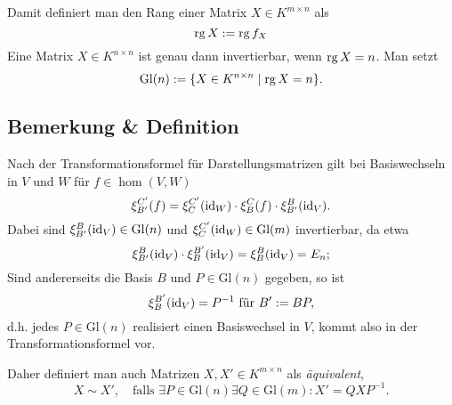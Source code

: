	\begin{Definition}
		Damit definiert man den Rang einer Matrix $ X\in K^{m\times n} $ als
		\[
			\operatorname{rg} X:=\operatorname{rg} f_X
		\]
		Eine Matrix $ X\in K^{n\times n} $ ist genau dann invertierbar, wenn $ \operatorname{rg} X = n $. Man setzt
		\[
			\mathrm{Gl}(n):= \{X\in K^{n\times n}\mid \operatorname{rg} X =n\}.
		\]
	\end{Definition}
\subsection{Bemerkung \& Definition}
	Nach der Transformationsformel für Darstellungsmatrizen gilt bei Basiswechseln in $ V $ und $ W $ für $ f\in \hom(V,W) $
	\[
		\xi_{B'}^{C'}(f) = \xi_C^{C'}(\operatorname{id}_W)\cdot \xi_B^C(f)\cdot \xi_{B'}^B(\operatorname{id}_V).
	\]
	Dabei sind $ \xi_{B'}^B(\operatorname{id}_V)\in \mathrm{Gl}(n) $ und $ \xi_C^{C'}(\operatorname{id}_W)\in \mathrm{Gl}(m) $ invertierbar, da etwa
	\[
		\xi^B_{B'}(\operatorname{id}_V)\cdot\xi_B^{B'}(\operatorname{id}_V) = \xi_B^B(\operatorname{id}_V)=E_n;
	\]
	Sind andererseits die Basis $ B $ und $ P\in \mathrm{Gl}(n) $ gegeben, so ist
	\[
		\xi_B^{B'}(\operatorname{id}_V)=P^{-1} \text{ für } B':= BP,
	\]
	d.h. jedes $ P\in \mathrm{Gl}(n) $ realisiert einen Basiswechsel in $ V $, kommt also in der Transformationsformel vor.

	\begin{Definition}
		Daher definiert man auch Matrizen $ X,X'\in K^{m\times n} $ als \emph{äquivalent},
		\[
			X\sim X',\quad \text{falls }\exists P\in \mathrm{Gl}(n)\exists Q\in \mathrm{Gl}(m):X' = QXP^{-1}.
		\]
	\end{Definition}
